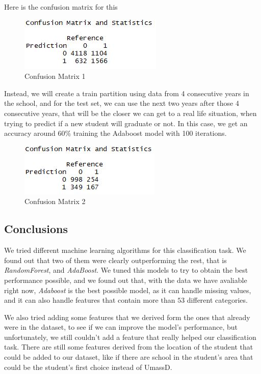 \documentclass{article}
\begin{document}
Here is the confusion matrix for this 

\begin{figure}[H]
\begin{center}
\includegraphics[scale=1]{Conf1}
\end{center}
\caption{Confusion Matrix 1}
\end{figure}

Instead, we will create a train partition using data from 4 consecutive years in the school, and for the test set, we can use the next two years after those 4 consecutive years, that will be the closer we can get to a real life situation, when trying to predict if a new student will graduate or not. In this case, we get an accuracy around 60\% training the Adaboost model with 100 iterations.

\begin{figure}[H]
\begin{center}
\includegraphics[scale=1]{Conf2}
\end{center}
\caption{Confusion Matrix 2}
\end{figure}

\subsection*{Conclusions}

We tried different machine learning algorithms for this classification task. We found out that two of them were clearly outperforming the rest, that is \textit{RandomForest}, and \textit{AdaBoost}. We tuned this models to try to obtain the best performance possible, and we found out that, with the data we have avaliable right now, \textit{Adaboost} is the best possible model, as it can handle missing values, and it can also handle features that contain more than $53$ different categories.  

We also tried adding some features that we derived form the ones that already were in the dataset, to see if we can improve the model's performance, but unfortunately, we still couldn't add a feature that really helped our classification task. There are still some features derived from the location of the student that could be added to our dataset, like if there are school in the student's area that could be the student's first choice instead of UmassD.
\end{document}
